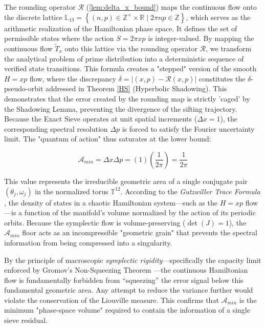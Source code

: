 \documentclass[sn-mathphys-num, pdflatex]{sn-jnl}
\begin{document}
The rounding operator $\mathcal{R}$ (\ref{lem:delta_x_bound}) maps the continuous flow onto the discrete lattice $\mathbb{L}_{13}=\left\{ (n, p) \in \mathbb{Z}^{+} \times \mathbb{R} \mid 2\pi np \in \mathbb{Z} \right\}$, which serves as the arithmetic realization of the Hamiltonian phase space. It defines the set of permissible states where the action $S = 2\pi xp$ is integer-valued. By mapping the continuous flow $\tilde{T}_x$ onto this lattice via the rounding operator $\mathcal{R}$, we transform the analytical problem of prime distribution into a deterministic sequence of verified state transitions. This formula creates a "stepped" version of the smooth $H=xp$ flow, where the discrepancy $\delta = | (x, p) - \mathcal{R}(x, p) |$ constitutes the $\delta$-pseudo-orbit addressed in Theorem \ref{HS} (Hyperbolic Shadowing). This demonstrates that the error created by the rounding map is strictly 'caged' by the Shadowing Lemma, preventing the divergence of the sifting trajectory. Because the Exact Sieve operates at unit spatial increments ($\Delta x = 1$), the corresponding spectral resolution $\Delta p$ is forced to satisfy the Fourier uncertainty limit. The "quantum of action" thus saturates at the lower bound:  

\begin{equation}
\label{A_min}
\mathcal{A}_{min} = \Delta x \Delta p = (1)\left(\frac{1}{2\pi}\right) = \frac{1}{2\pi}\end{equation} 

This value represents the irreducible geometric area of a single conjugate pair $(\theta_j, \omega_j)$ in the normalized torus $\mathbb{T}^{12}$. According to the \textit{Gutzwiller Trace Formula} \cite{gutzwiller}, the density of states in a chaotic Hamiltonian system—such as the $H=xp$ flow—is a function of the manifold's volume normalized by the action of its periodic orbits. Because the symplectic flow is volume-preserving ($\det(J)=1$), the $\mathcal{A}_{min}$ floor acts as an incompressible "geometric grain" that prevents the spectral information from being compressed into a singularity. 

By the principle of macroscopic \textit{symplectic rigidity}---specifically the capacity limit enforced by Gromov's Non-Squeezing Theorem \cite{gromov}---the continuous Hamiltonian flow is fundamentally forbidden from ``squeezing'' the error signal below this fundamental geometric area. Any attempt to reduce the variance further would violate the conservation of the Liouville measure. This confirms that $\mathcal{A}_{min}$ is the minimum "phase-space volume" required to contain the information of a single sieve residual.
\end{document}
